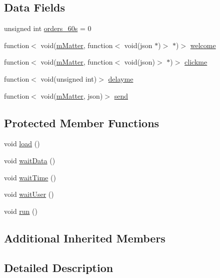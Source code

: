 \subsection*{Data Fields}
\begin{DoxyCompactItemize}
\item 
unsigned int \hyperlink{class_k_1_1_u_i_a44abb2b500cfc21ada184903fb08f22d}{orders\+\_\+60s} = 0
\item 
function$<$ void(\hyperlink{namespace_k_a06e0333f0bcd3fc79835735bb9cda73d}{m\+Matter}, function$<$ void(json $\ast$)$>$ $\ast$)$>$ \hyperlink{class_k_1_1_u_i_aee907877a47fa78974d6b9a2ed1d1fad}{welcome}
\item 
function$<$ void(\hyperlink{namespace_k_a06e0333f0bcd3fc79835735bb9cda73d}{m\+Matter}, function$<$ void(json)$>$ $\ast$)$>$ \hyperlink{class_k_1_1_u_i_ad892fbcdba0fed791f3afcf1bdd0e8c7}{clickme}
\item 
function$<$ void(unsigned int)$>$ \hyperlink{class_k_1_1_u_i_aa83b4957f3c3b6166c641811adc7ebff}{delayme}
\item 
function$<$ void(\hyperlink{namespace_k_a06e0333f0bcd3fc79835735bb9cda73d}{m\+Matter}, json)$>$ \hyperlink{class_k_1_1_u_i_ac38fb07fa9906993bdfa70f5005037c2}{send}
\end{DoxyCompactItemize}
\subsection*{Protected Member Functions}
\begin{DoxyCompactItemize}
\item 
void \hyperlink{class_k_1_1_u_i_a78f61ac2dd03bcba8e09ca20cd7d68e3}{load} ()
\item 
void \hyperlink{class_k_1_1_u_i_aa9a0f090ee360e2a9f967200d30f4a22}{wait\+Data} ()
\item 
void \hyperlink{class_k_1_1_u_i_ade4c89163dbda531e71c8c75eb2868b4}{wait\+Time} ()
\item 
void \hyperlink{class_k_1_1_u_i_aa3f7b56799f5915cfbc902f6426c2bb2}{wait\+User} ()
\item 
void \hyperlink{class_k_1_1_u_i_a13a43e6d814de94978c515cb084873b1}{run} ()
\end{DoxyCompactItemize}
\subsection*{Additional Inherited Members}


\subsection{Detailed Description}


